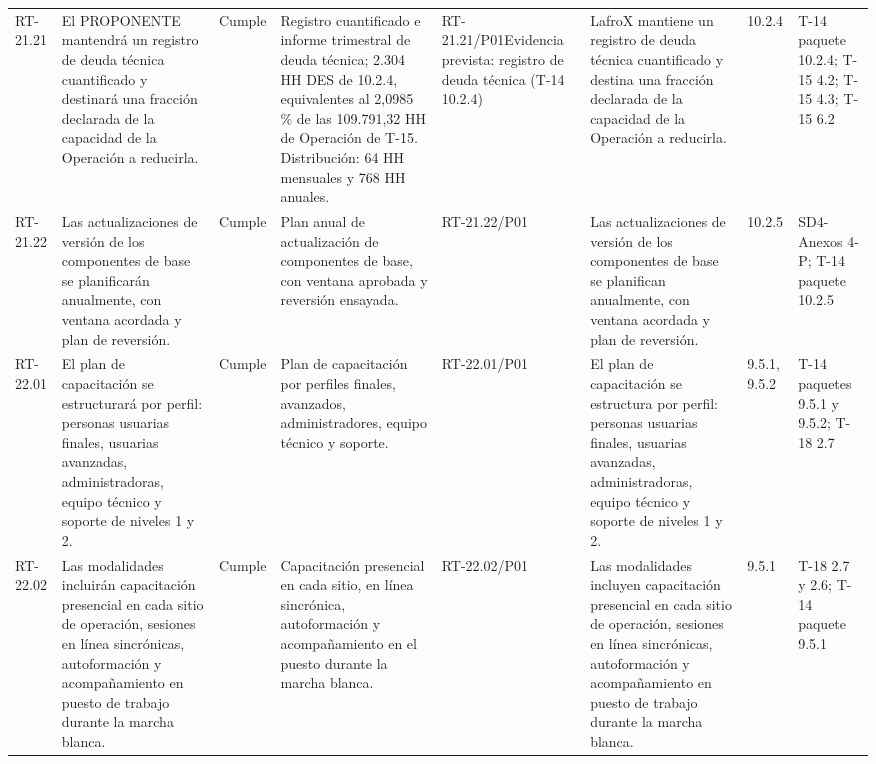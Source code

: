 \documentclass[oficio,firma,final]{lafrox}
\begin{document}
\begin{landscape}
{\begin{longtable}{@{}F{0.054} F{0.173} F{0.061} F{0.191} F{0.106} F{0.180} F{0.067} F{0.168}@{}}
  RT-21.21 & El PROPONENTE mantendrá un registro de deuda técnica cuantificado y destinará una fracción declarada de la capacidad de la Operación a reducirla. & Cumple & Registro cuantificado e informe trimestral de deuda técnica; 2.304 HH DES de 10.2.4, equivalentes al 2,0985 \% de las 109.791,32 HH de Operación de T-15. Distribución: 64 HH mensuales y 768 HH anuales. & RT-21.21/\allowbreak{}P01\newline Evidencia prevista: registro de deuda técnica (T-14 10.2.4) & LafroX mantiene un registro de deuda técnica cuantificado y destina una fracción declarada de la capacidad de la Operación a reducirla. & 10.2.4 & T-14 paquete 10.2.4; T-15 4.2; T-15 4.3; T-15 6.2  \\
  RT-21.22 & Las actualizaciones de versión de los componentes de base se planificarán anualmente, con ventana acordada y plan de reversión. & Cumple & Plan anual de actualización de componentes de base, con ventana aprobada y reversión ensayada. & RT-21.22/\allowbreak{}P01 & Las actualizaciones de versión de los componentes de base se planifican anualmente, con ventana acordada y plan de reversión. & 10.2.5 & SD4-Anexos 4-P; T-14 paquete 10.2.5  \\
  RT-22.01 & El plan de capacitación se estructurará por perfil: personas usuarias finales, usuarias avanzadas, administradoras, equipo técnico y soporte de niveles 1 y 2. & Cumple & Plan de capacitación por perfiles finales, avanzados, administradores, equipo técnico y soporte. & RT-22.01/\allowbreak{}P01 & El plan de capacitación se estructura por perfil: personas usuarias finales, usuarias avanzadas, administradoras, equipo técnico y soporte de niveles 1 y 2. & 9.5.1, 9.5.2 & T-14 paquetes 9.5.1 y 9.5.2; T-18 2.7  \\
  RT-22.02 & Las modalidades incluirán capacitación presencial en cada sitio de operación, sesiones en línea sincrónicas, autoformación y acompañamiento en puesto de trabajo durante la marcha blanca. & Cumple & Capacitación presencial en cada sitio, en línea sincrónica, autoformación y acompañamiento en el puesto durante la marcha blanca. & RT-22.02/\allowbreak{}P01 & Las modalidades incluyen capacitación presencial en cada sitio de operación, sesiones en línea sincrónicas, autoformación y acompañamiento en puesto de trabajo durante la marcha blanca. & 9.5.1 & T-18 2.7 y 2.6; T-14 paquete 9.5.1  \\

\end{longtable}}
\end{landscape}
\end{document}
